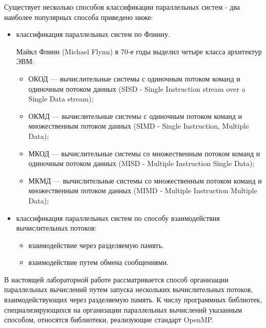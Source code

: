 Существует несколько способов классификации параллельных систем - два наиболее популярных способа приведено ниже:

\begin{itemize}

	\item классификация параллельных систем по Флинну.

	Майкл Флинн (Michael Flynn) в 70-е годы выделил четыре класса архитектур ЭВМ:

	\begin{itemize}
	
		\item ОКОД — вычислительные системы с одиночным потоком команд и одиночным потоком данных (SISD - Single Instruction stream over a Single Data stream);
		\item ОКМД — вычислительные системы с одиночным потоком команд и множественным потоком данных (SIMD - Single Instruction, Multiple Data);
		\item МКОД — вычислительные системы со множественным потоком команд и одиночным потоком данных (MISD - Multiple Instruction Single Data);
		\item МКМД — вычислительные системы со множественным потоком команд и множественным потоком данных (MIMD - Multiple Instruction Multiple Data);

	\end{itemize}

	\item классификация параллельных систем по способу взаимодействия вычислительных потоков:

	\begin{itemize}

		\item взаимодействие через разделяемую память.
		\item взаимодействие путем обмена сообщениями.

	\end{itemize}

\end{itemize}

В настоящей лабораторной работе рассматривается способ организации параллельных вычислений путем запуска нескольких вычислительных потоков, взаимодействующих через разделяемую память. К числу программных библиотек, специализирующихся на организации параллельных вычислений указанным способом, относятся библиотеки, реализующие стандарт OpenMP.


